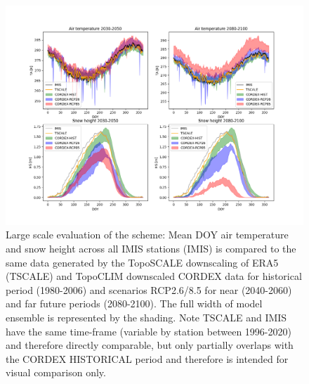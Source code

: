 \documentclass[hess, manuscript]{copernicus}
\begin{document}
\begin{figure}[t]

\includegraphics[width=18cm]{"plots/imis-4panel_V2.png"}
\caption{Large scale evaluation of the scheme: Mean DOY air temperature and snow height across all IMIS stations (IMIS) is compared to the same data generated by the TopoSCALE downscaling of ERA5 (TSCALE) and TopoCLIM downscaled CORDEX data for historical period (1980-2006) and scenarios RCP2.6/8.5 for near (2040-2060) and far future periods (2080-2100). The full width of model ensemble is represented by the shading. Note TSCALE and IMIS have the same time-frame (variable by station between 1996-2020) and therefore directly comparable, but only partially overlaps with the CORDEX HISTORICAL period and therefore is intended for visual comparison only. }
\end{figure}

\end{document}

